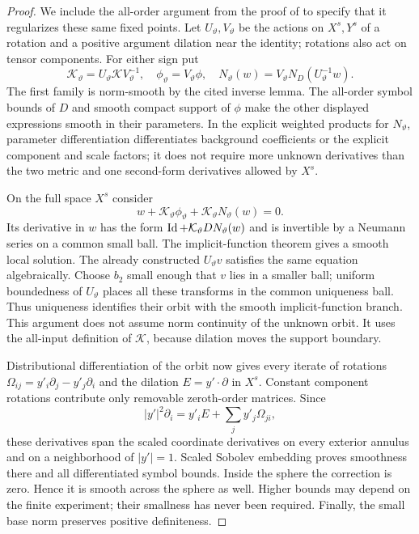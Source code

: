 \begin{proof}
We include the all-order argument from the proof of
\cite[]{Foundation} to specify that it regularizes these
same fixed points.  Let $U_\vartheta,V_\vartheta$ be the actions on
$X^s,Y^s$ of a rotation and a positive argument dilation near the
identity; rotations also act on tensor components.  For either
sign put
\[
 \mathcal K_\vartheta=U_\vartheta\mathcal K V_\vartheta^{-1},
 \quad \phi_\vartheta=V_\vartheta\phi,
 \quad N_\vartheta(w)=V_\vartheta N_D(U_\vartheta^{-1}w).
\]
The first family is norm-smooth by the cited inverse lemma.
The all-order symbol bounds of $D$ and smooth compact support of
$\phi$ make the other displayed expressions smooth in their
parameters.  In the explicit weighted products for $N_\vartheta$,
parameter differentiation differentiates background coefficients or
the explicit component and scale factors; it does not require more
unknown derivatives than the two metric and one second-form
derivatives allowed by $X^s$.

On the full space $X^s$ consider
\begin{equation}\label{prep:regularity-equation}
 w+\mathcal K_\vartheta\phi_\vartheta
                 +\mathcal K_\vartheta N_\vartheta(w)=0.
\end{equation}
Its derivative in $w$ has the form $\operatorname{Id}+\mathcal K_\vartheta
DN_\vartheta(w)$ and is invertible by a Neumann series on a common
small ball.  The implicit-function theorem gives a smooth local
solution.  The already constructed $U_\vartheta v$ satisfies the
same equation algebraically.  Choose $b_2$ small enough that $v$
lies in a smaller ball; uniform boundedness of $U_\vartheta$ places
all these transforms in the common uniqueness ball.  Thus uniqueness
identifies their orbit with the smooth implicit-function branch.
This argument does not assume norm continuity of the unknown orbit.
It uses the all-input definition of $\mathcal K$, because dilation
moves the support boundary.

Distributional differentiation of the orbit now gives every iterate
of rotations $\Omega_{ij}=y'_i\partial_j-y'_j\partial_i$ and the
dilation $E=y'\cdot\partial$ in $X^s$.  Constant component rotations
contribute only removable zeroth-order matrices.  Since
\[
 |y'|^2\partial_i=y'_iE+\sum_j y'_j\Omega_{ji},
\]
these derivatives span the scaled coordinate derivatives on every
exterior annulus and on a neighborhood of $|y'|=1$.  Scaled Sobolev
embedding proves smoothness there and all differentiated symbol
bounds.  Inside the sphere the correction is zero.  Hence it is
smooth across the sphere as well.  Higher bounds may depend on the
finite experiment; their smallness has never been required.
Finally, the small base norm preserves positive definiteness.
\end{proof}

